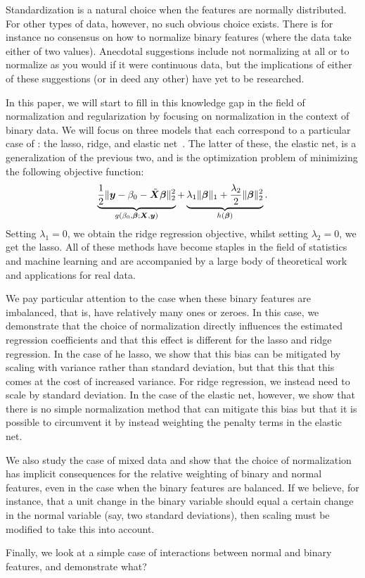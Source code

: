 Standardization is a natural choice when the features are normally distributed. For other
types of data, however, no such obvious choice exists. There is for instance no consensus
on how to normalize binary features (where the data take either of two values). Anecdotal
suggestions include not normalizing at all or to normalize as you would if it were
continuous data, but the implications of either of these suggestions (or in deed any other)
have yet to be researched.

In this paper, we will start to fill in this knowledge gap in the field of normalization
and regularization by focusing on normalization in the context of binary data. We will
focus on three models that each correspond to a particular case of
: the lasso, ridge, and elastic net~\citep{zou2005}. The latter
of these, the elastic net, is a generalization of the previous two, and is the optimization
problem of minimizing the following objective function:
\begin{equation*}
  \underbrace{\frac{1}{2} \lVert \boldsymbol y - \beta_0 - \tilde{\boldsymbol{X}}\boldsymbol{\beta} \rVert^2_2}_{g(\beta_0, \boldsymbol{\beta}; \boldsymbol{X}, \boldsymbol{y})}  + \underbrace{\lambda_1 \lVert \boldsymbol\beta \rVert_1 + \frac{\lambda_2}{2}\lVert \boldsymbol \beta \rVert_2^2}_{h(\boldsymbol{\beta})}.
\end{equation*}
%
Setting \(\lambda_1 = 0\), we obtain the ridge regression objective, whilst setting
\(\lambda_2 = 0\), we get the lasso. All of these methods have become staples in the field
of statistics and machine learning and are accompanied by a large body of theoretical work
and applications for real data.

We pay particular attention to the case when these binary features are imbalanced, that is,
have relatively many ones or zeroes. In this case, we demonstrate that the choice of
normalization directly influences the estimated regression coefficients and that this
effect is different for the lasso and ridge regression. In the case of he lasso, we show
that this bias can be mitigated by scaling with variance rather than standard deviation,
but that this that this comes at the cost of increased variance. For ridge regression, we
instead need to scale by standard deviation. In the case of the elastic net, however, we
show that there is no simple normalization method that can mitigate this bias but that it
is possible to circumvent it by instead weighting the penalty terms in the elastic net.

We also study the case of mixed data and show that the choice of normalization has implicit
consequences for the relative weighting of binary and normal features, even in the case
when the binary features are balanced. If we believe, for instance, that a unit change in
the binary variable should equal a certain change in the normal variable (say, two standard
deviations), then scaling must be modified to take this into account.

Finally, we look at a simple case of interactions between normal and binary features, and
demonstrate what?

